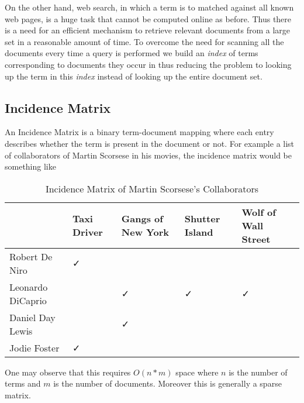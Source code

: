 On the other hand, web search, in which a term is to matched against all known web pages, is a huge task that cannot be computed online as before.
Thus there is a need for an efficient mechanism to retrieve relevant documents from a large set in a reasonable amount of time.
To overcome the need for scanning all the documents every time a query is performed we build an \textit{index} of terms corresponding to
documents they occur in thus reducing the problem to looking up the term in this \textit{index} instead of looking up the entire document set.

\subsection{Incidence Matrix}
An Incidence Matrix is a binary term-document mapping where each entry describes whether the term is present in the document or not.
For example a list of collaborators of Martin Scorsese in his movies, the incidence matrix would be something like

\begin{table}[ht]
  \caption{Incidence Matrix of Martin Scorsese's Collaborators}
  \centering
  \begin{tabular}{p{4cm}p{2cm}p{2cm}p{2cm}p{2cm}}
    \hline \hline
                      & Taxi Driver & Gangs of New York & Shutter Island & Wolf of Wall Street  \\
    \hline
    Robert De Niro    &      ✓      &                   &                &                      \\
    Leonardo DiCaprio &             &        ✓          &         ✓      &           ✓          \\
    Daniel Day Lewis  &             &        ✓          &                &                      \\
    Jodie Foster      &      ✓      &                   &                &                      \\
  \end{tabular}
\end{table}

One may observe that this requires $O(n*m)$ space where $n$ is the number of terms and $m$ is the number of documents.
Moreover this is generally a sparse matrix.

